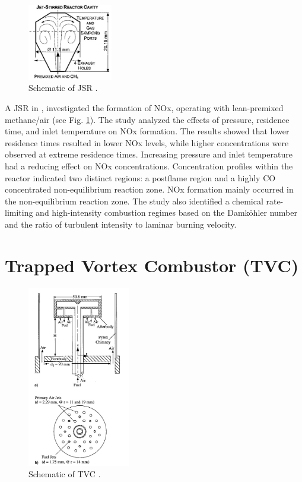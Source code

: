 \begin{figure}
    \centering
    \includegraphics[width=0.33\textwidth]{Chapter2/Images/JSR.jpeg}
  \caption[Schematic of JSR]{Schematic of JSR \cite{RUTAR20002435}.}
  \label{fig:JSR}
\end{figure}
A JSR in \cite{RUTAR20002435}, investigated the formation of NOx, operating with lean-premixed methane/air (see Fig. \ref{fig:JSR}). The study analyzed the effects of pressure, residence time, and inlet temperature on NOx formation. The results showed that lower residence times resulted in lower NOx levels, while higher concentrations were observed at extreme residence times. Increasing pressure and inlet temperature had a reducing effect on NOx concentrations. Concentration profiles within the reactor indicated two distinct regions: a postflame region and a highly CO concentrated non-equilibrium reaction zone. NOx formation mainly occurred in the non-equilibrium reaction zone. The study also identified a chemical rate-limiting  and high-intensity combustion regimes based on the Damköhler number and the ratio of turbulent intensity to laminar burning velocity.

\section{Trapped Vortex Combustor (TVC)}

\begin{figure}
    \centering    \includegraphics[width=0.4\textwidth]{Chapter2/Images/TVC.jpeg}
    \caption[Schematic of TVC]{Schematic of TVC \cite{TVC5266}.}
    \label{fig:TVC}
\end{figure}

